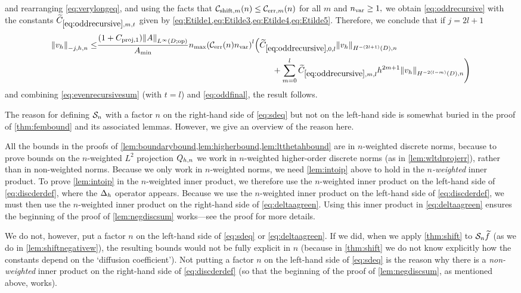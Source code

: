 and rearranging \cref{eq:verylongeq}, and using the facts that $\shiftn{m} \leq \errn{m}$ for all $m$ and $n_{\mathrm{var}} \geq 1,$ we obtain \cref{eq:oddrecursive} with the constants $\Etildefn{m,t}$ given by \cref{eq:Etilde1,eq:Etilde3,eq:Etilde4,eq:Etilde5}. Therefore, we conclude that if $j = 2l+1$
\begin{align}
\Nfn{-j,h,n}{\vh} \leq& \frac{\mleft(1+\Cprojfn{1}\mright)\NLiDop{A}}{\Amin}\nmax\mleft(\En \nvar\mright)^{l}\mleft(\Etildefn{0,l} \NHnfn{-(2l+1)}{D}{\vh}\mright.\nonumber\\
&\mleft.\hphantom{\frac{\mleft(1+\Cprojfn{1}\mright)\NLiDop{A}}{\Amin}\nmax\mleft(\En \nvar\mright)^{l}}
\quad\quad+ \sum_{m=0}^{l} \Etildefn{m,l} h^{2m+1}  \NHnfn{-2(l-m)}{D}{\vh}\mright)\label{eq:oddfinal}
\end{align}
and combining \cref{eq:evenrecursivesum} (with $t=l$) and \cref{eq:oddfinal}, the result follows.%
\epf

\label{rem:why}
The reason for defining $\mathcal S_{n}$ with a factor $n$ on the right-hand side of \cref{eq:sdeq} but not on the left-hand side is somewhat buried in the proof of \cref{thm:fembound} and its associated lemmas. However, we give an overview of the reason here.

All the bounds in the proofs of \cref{lem:boundarybound,lem:higherbound,lem:ltthetahbound} are in $n$-weighted discrete norms, because to prove bounds on the $n$-weighted $L^2$ projection $Q_{h,n}$ we work in $n$-weighted higher-order discrete norms (as in \cref{lem:wltdprojerr}), rather than in non-weighted norms. Because we only work in $n$-weighted norms, we need \cref{lem:intoip} above to hold in the \emph{$n$-weighted} inner product. To prove \cref{lem:intoip} in the $n$-weighted inner product, we therefore use the $n$-weighted inner product on the left-hand side of \cref{eq:discderdef}, where the $\Delta_{h}$ operator appears. Because we use the $n$-weighted inner product on the left-hand side of \cref{eq:discderdef}, we must then use the $n$-weighted inner product on the right-hand side of \cref{eq:deltaagreen}. Using this inner product in \cref{eq:deltaagreen} ensures the beginning of the proof of \cref{lem:negdiscsum} works---see the proof for more details.

We do not, however, put a factor $n$ on the left-hand side of \cref{eq:sdeq} or \cref{eq:deltaagreen}. If we did, when we apply \cref{thm:shift} to $\mathcal S_{n} \widetilde{f}$ (as we do in \cref{lem:shiftnegativew}), the resulting bounds would not be fully explicit in $n$ (because in \cref{thm:shift} we do not know explicitly how the constants depend on the `diffusion coefficient'). Not putting a factor $n$ on the left-hand side of \cref{eq:sdeq} is the reason why there is a \emph{non-weighted} inner product on the right-hand side of \cref{eq:discderdef} (so that the beginning of the proof of \cref{lem:negdiscsum}, as mentioned above, works).
\ere

